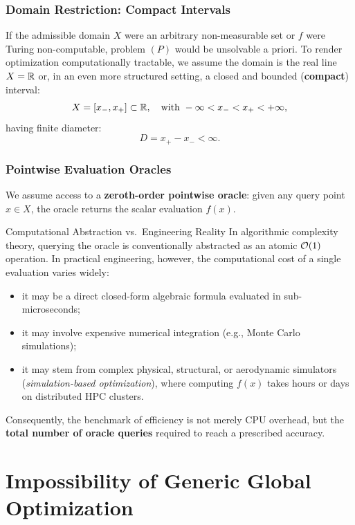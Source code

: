 \subsubsection{Domain Restriction: Compact Intervals}
If the admissible domain $X$ were an arbitrary non-measurable set or $f$ were Turing non-computable, problem $(P)$ would be unsolvable a priori. To render optimization computationally tractable, we assume the domain is the real line $X = \mathbb{R}$ or, in an even more structured setting, a closed and bounded (\textbf{compact}) interval:
\begin{equation}
    X = [x_-, x_+] \subset \mathbb{R}, \quad \text{with } -\infty < x_- < x_+ < +\infty,
\end{equation}
having finite diameter:
\begin{equation}
    D = x_+ - x_- < \infty.
\end{equation}

\subsubsection{Pointwise Evaluation Oracles}
We assume access to a \textbf{zeroth-order pointwise oracle}: given any query point $x \in X$, the oracle returns the scalar evaluation $f(x)$.

\begin{noteblock}{Computational Abstraction vs.\ Engineering Reality}
In algorithmic complexity theory, querying the oracle is conventionally abstracted as an atomic $\mathcal{O}\!\left(1\right)$ operation. In practical engineering, however, the computational cost of a single evaluation varies widely:
\begin{itemize}
    \item it may be a direct closed-form algebraic formula evaluated in sub-microseconds;
    \item it may involve expensive numerical integration (e.g., Monte Carlo simulations);
    \item it may stem from complex physical, structural, or aerodynamic simulators (\textit{simulation-based optimization}), where computing $f(x)$ takes hours or days on distributed HPC clusters.
\end{itemize}
Consequently, the benchmark of efficiency is not merely CPU overhead, but the \textbf{total number of oracle queries} required to reach a prescribed accuracy.
\end{noteblock}

\FloatBarrier
\section{Impossibility of Generic Global Optimization}
\label{sec:univariate-global-impossibility-en}

